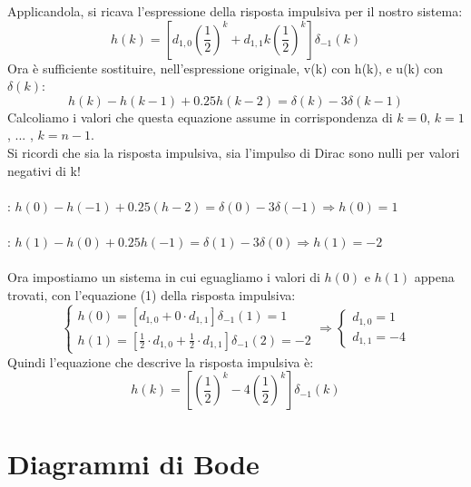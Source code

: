 \documentclass[12pt,a4paper]{article}
\begin{document}
\begin{enumerate}
\[		\]
		Applicandola, si ricava l'espressione della risposta impulsiva per il nostro sistema:
		\begin{equation}
			h(k) = \left[d_{1,0}\left(\frac{1}{2}\right)^k + d_{1,1}k\left(\frac{1}{2}\right)^k\right]\delta_{-1}(k)
		\end{equation}
		Ora \`e sufficiente sostituire, nell'espressione originale, v(k) con h(k), e u(k) con $\delta(k)$:
		\[
			h(k) - h(k-1) + 0.25h(k-2) = \delta(k) - 3\delta(k-1)
		\]
		Calcoliamo i valori che questa equazione assume in corrispondenza di $k=0$, $k=1$, ... , $k=n-1$.\\
		Si ricordi che sia la risposta impulsiva, sia l'impulso di Dirac sono nulli per valori negativi di k!\\ \\
		 : $h(0) - h(-1) + 0.25(h-2) = \delta(0) - 3\delta(-1) \Rightarrow h(0) = 1$\\ \\
		 : $h(1) - h(0) + 0.25h(-1) = \delta(1)- 3\delta(0)\Rightarrow h(1) = -2$\\ \\
		Ora impostiamo un sistema in cui eguagliamo i valori di $h(0)$ e $h(1)$ appena trovati, con l'equazione (1) della risposta impulsiva:\\
		\[
			\begin{cases}
				h(0) = \left[d_{1,0} + 0\cdot d_{1,1}\right]\delta_{-1}(1) = 1\\
				h(1) = \left[\frac{1}{2}\cdot d_{1,0} + \frac{1}{2}\cdot d_{1,1}\right]\delta_{-1}(2) = -2
			\end{cases}
			\Rightarrow
			\begin{cases}
				d_{1,0} = 1\\
				d_{1,1} = -4
			\end{cases}
		\]
		Quindi l'equazione che descrive la risposta impulsiva \`e:
		\[
			h(k) = \left[\left(\frac{1}{2}\right)^k -4\left(\frac{1}{2}\right)^k\right]\delta_{-1}(k)
		\]
	\end{enumerate}
	\newpage
	\section*{Diagrammi di Bode}
\end{document}
